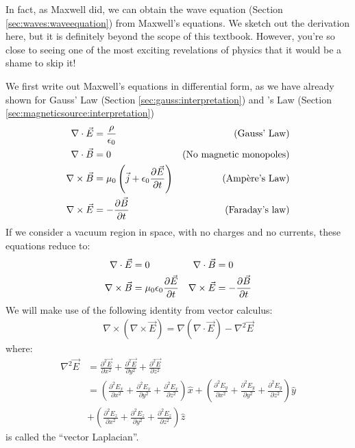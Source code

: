 In fact, as Maxwell did, we can obtain the wave equation (Section \ref{sec:waves:waveequation}) from Maxwell's equations. We sketch out the derivation here, but it is definitely beyond the scope of this textbook. However, you're so close to seeing one of the most exciting revelations of physics that it would be a shame to skip it! 

We first write out Maxwell's equations in differential form, as we have already shown for Gauss' Law (Section \ref{sec:gauss:interpretation}) and \ampere's Law (Section \ref{sec:magneticsource:interpretation})
\begin{align*}
 \nabla \cdot \vec E &= \frac{\rho}{\epsilon_0} &\text{(Gauss' Law)}\\
 \nabla \cdot \vec B&= 0 &\text{(No magnetic monopoles)}\\
 \nabla \times \vec B &= \mu_0 \left(\vec j + \epsilon_0\frac{\partial \vec E}{\partial t}\right) &\text{(Amp\`ere's Law)}\\
 \nabla \times \vec E &= -\frac{\partial \vec B}{\partial t} &\text{(Faraday's law)}\\
\end{align*}
If we consider a vacuum region in space, with no charges and no currents, these equations reduce to:
\begin{align*}
\nabla \cdot \vec E &= 0 &\nabla \cdot \vec B&= 0\\
\nabla \times \vec B &= \mu_0 \epsilon_0\frac{\partial \vec E}{\partial t} & \nabla \times \vec E &= -\frac{\partial \vec B}{\partial t}
\end{align*}
We will make use of the following identity from vector calculus:
\begin{align*}
\nabla \times (\nabla \times \vec E)=\nabla(\nabla\cdot \vec E)-\nabla^2\vec E
\end{align*}
where:
\begin{align*}
\nabla^2\vec E &= \frac{\partial^2 \vec E}{\partial x^2}+\frac{\partial^2 \vec E}{\partial y^2} + \frac{\partial^2 \vec E}{\partial z^2}\\
&=\left(\frac{\partial^2 E_x}{\partial x^2}+\frac{\partial^2  E_x}{\partial y^2} + \frac{\partial^2 E_x}{\partial z^2} \right) \hat x+ \left( \frac{\partial^2 E_y}{\partial x^2}+\frac{\partial^2  E_y}{\partial y^2} + \frac{\partial^2 E_y}{\partial z^2} \right) \hat y \\
&+ \left(\frac{\partial^2 E_z}{\partial x^2}+\frac{\partial^2  E_z}{\partial y^2} + \frac{\partial^2 E_z}{\partial z^2}  \right) \hat z
\end{align*}
is called the ``vector Laplacian''.

